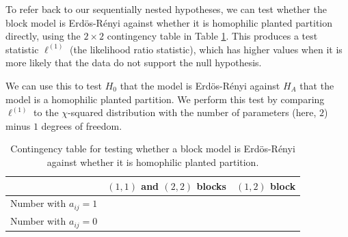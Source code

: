 To refer back to our sequentially nested hypotheses, we can test whether the block model is Erd\"os-R\'enyi against whether it is homophilic planted partition directly, using the $2 \times 2$ contingency table in Table \ref{tab:ch7:model:cont_homo}. This produces a test statistic $\ell^{(1)}$ (the likelihood ratio statistic), which has higher values when it is more likely that the data do not support the null hypothesis. 

We can use this to test $H_0$ that the model is Erd\"os-R\'enyi against $H_A$ that the model is a homophilic planted partition. We perform this test by comparing $\ell^{(1)}$ to the $\chi$-squared distribution with the number of parameters (here, $2$) minus $1$ degrees of freedom. 

\begin{table}[h]
    \centering
    \begin{tabular}{c|c|c}
         & $(1, 1)$ and $(2, 2)$ blocks & $(1, 2)$ block \\
         \hline
         Number with $a_{ij} = 1$ & & \\
         Number with $a_{ij} = 0$ & & 
    \end{tabular}
    \caption{Contingency table for testing whether a block model is Erd\"os-R\'enyi against whether it is homophilic planted partition.}
    \label{tab:ch7:model:cont_homo}
\end{table}

